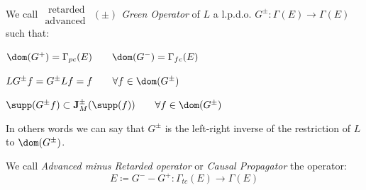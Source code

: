 \documentclass[a4paper,10pt,smallheadings]{scrartcl}
\begin{document}
			\begin{definition}\label{Def:GreenOperators}
				We call \emph{$\substack{\textrm{ retarded}\\ \textrm{advanced } } (\pm)$ Green Operator} of $L$ a
				l.p.d.o. $G^\pm : \Gamma (E) \rightarrow \Gamma(E)$ such that:
				\begin{compactitemize}
					\item $\dom(G^+) = \Gamma_{pc}(E) \qquad \dom(G^-) = \Gamma_{fc}(E)$
					\item $LG^\pm f=G^\pm Lf = f \qquad \forall f\in \dom(G^\pm)$
					\item $\supp(G^\pm f) \subset \mathbf{J}^\pm_M (\supp(f)) \qquad \forall f\in \dom(G^\pm)$
				\end{compactitemize}
				In others words we can say that
				$G^\pm$ is the left-right inverse of the restriction of $L$ to $\dom(G^\pm)$.
			\end{definition}

			\begin{notationfix}

				We call \emph{Advanced minus Retarded operator} or \emph{Causal Propagator}\cite{Benini2013} the operator:
				\begin{displaymath}
					E \coloneqq G^-  - G^+ : \Gamma_{tc}(E) \rightarrow \Gamma(E)
				\end{displaymath}
			\end{notationfix}
\end{document}
